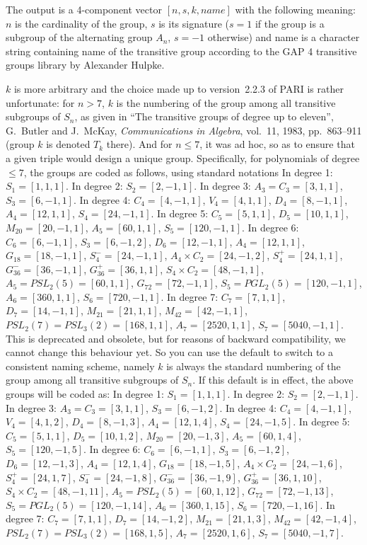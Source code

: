 The output is a 4-component vector $[n,s,k,name]$ with the
following meaning: $n$ is the cardinality of the group, $s$ is its signature
($s=1$ if the group is a subgroup of the alternating group $A_n$, $s=-1$
otherwise) and name is a character string containing name of the transitive
group according to the GAP 4 transitive groups library by Alexander Hulpke.

$k$ is more arbitrary and the choice made up to version~2.2.3 of PARI is rather
unfortunate: for $n > 7$, $k$ is the numbering of the group among all
transitive subgroups of $S_n$, as given in ``The transitive groups of degree up
to eleven'', G.~Butler and J.~McKay, \emph{Communications in Algebra}, vol.~11,
1983,
pp.~863--911 (group $k$ is denoted $T_k$ there). And for $n \leq 7$, it was ad
hoc, so as to ensure that a given triple would design a unique group.
Specifically, for polynomials of degree $\leq 7$, the groups are coded as
follows, using standard notations
\smallskip
In degree 1: $S_1=[1,1,1]$.
\smallskip
In degree 2: $S_2=[2,-1,1]$.
\smallskip
In degree 3: $A_3=C_3=[3,1,1]$, $S_3=[6,-1,1]$.
\smallskip
In degree 4: $C_4=[4,-1,1]$, $V_4=[4,1,1]$, $D_4=[8,-1,1]$, $A_4=[12,1,1]$,
$S_4=[24,-1,1]$.
\smallskip
In degree 5: $C_5=[5,1,1]$, $D_5=[10,1,1]$, $M_{20}=[20,-1,1]$,
 $A_5=[60,1,1]$, $S_5=[120,-1,1]$.
\smallskip
In degree 6: $C_6=[6,-1,1]$, $S_3=[6,-1,2]$, $D_6=[12,-1,1]$, $A_4=[12,1,1]$,
$G_{18}=[18,-1,1]$, $S_4^-=[24,-1,1]$, $A_4\times C_2=[24,-1,2]$,
$S_4^+=[24,1,1]$, $G_{36}^-=[36,-1,1]$, $G_{36}^+=[36,1,1]$,
$S_4\times C_2=[48,-1,1]$, $A_5=PSL_2(5)=[60,1,1]$, $G_{72}=[72,-1,1]$,
$S_5=PGL_2(5)=[120,-1,1]$, $A_6=[360,1,1]$, $S_6=[720,-1,1]$.
\smallskip
In degree 7: $C_7=[7,1,1]$, $D_7=[14,-1,1]$, $M_{21}=[21,1,1]$,
$M_{42}=[42,-1,1]$, $PSL_2(7)=PSL_3(2)=[168,1,1]$, $A_7=[2520,1,1]$,
$S_7=[5040,-1,1]$.
\smallskip
This is deprecated and obsolete, but for reasons of backward compatibility,
we cannot change this behaviour yet. So you can use the default
 to switch to a consistent naming scheme, namely $k$ is
always the standard numbering of the group among all transitive subgroups of
$S_n$. If this default is in effect, the above groups will be coded as:
\smallskip
In degree 1: $S_1=[1,1,1]$.
\smallskip
In degree 2: $S_2=[2,-1,1]$.
\smallskip
In degree 3: $A_3=C_3=[3,1,1]$, $S_3=[6,-1,2]$.
\smallskip
In degree 4: $C_4=[4,-1,1]$, $V_4=[4,1,2]$, $D_4=[8,-1,3]$, $A_4=[12,1,4]$,
$S_4=[24,-1,5]$.
\smallskip
In degree 5: $C_5=[5,1,1]$, $D_5=[10,1,2]$, $M_{20}=[20,-1,3]$,
 $A_5=[60,1,4]$, $S_5=[120,-1,5]$.
\smallskip
In degree 6: $C_6=[6,-1,1]$, $S_3=[6,-1,2]$, $D_6=[12,-1,3]$, $A_4=[12,1,4]$,
$G_{18}=[18,-1,5]$, $A_4\times C_2=[24,-1,6]$, $S_4^+=[24,1,7]$,
$S_4^-=[24,-1,8]$, $G_{36}^-=[36,-1,9]$, $G_{36}^+=[36,1,10]$,
$S_4\times C_2=[48,-1,11]$, $A_5=PSL_2(5)=[60,1,12]$, $G_{72}=[72,-1,13]$,
$S_5=PGL_2(5)=[120,-1,14]$, $A_6=[360,1,15]$, $S_6=[720,-1,16]$.
\smallskip
In degree 7: $C_7=[7,1,1]$, $D_7=[14,-1,2]$, $M_{21}=[21,1,3]$,
$M_{42}=[42,-1,4]$, $PSL_2(7)=PSL_3(2)=[168,1,5]$, $A_7=[2520,1,6]$,
$S_7=[5040,-1,7]$.
\smallskip

